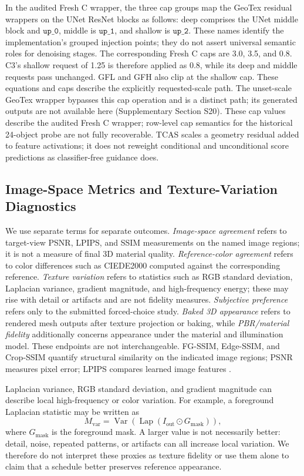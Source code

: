 \documentclass[times,twocolumn,final]{elsarticle}
\begin{document}
In the audited Fresh C wrapper, the three cap groups map the GeoTex residual wrappers on the UNet ResNet blocks as follows: deep comprises the UNet middle block and $\texttt{up\_0}$, middle is $\texttt{up\_1}$, and shallow is $\texttt{up\_2}$. These names identify the implementation's grouped injection points; they do not assert universal semantic roles for denoising stages. The corresponding Fresh C caps are 3.0, 3.5, and 0.8. C3's shallow request of 1.25 is therefore applied as 0.8, while its deep and middle requests pass unchanged. GFL and GFH also clip at the shallow cap. These equations and caps describe the explicitly requested-scale path. The unset-scale GeoTex wrapper bypasses this cap operation and is a distinct path; its generated outputs are not available here (Supplementary Section S20). These cap values describe the audited Fresh C wrapper; row-level cap semantics for the historical 24-object probe are not fully recoverable. TCAS scales a geometry residual added to feature activations; it does not reweight conditional and unconditional score predictions as classifier-free guidance does.

\subsection{Image-Space Metrics and Texture-Variation Diagnostics}
\label{subsec:metrics}

We use separate terms for separate outcomes. \emph{Image-space agreement} refers to target-view PSNR, LPIPS, and SSIM measurements on the named image regions; it is not a measure of final 3D material quality. \emph{Reference-color agreement} refers to color differences such as CIEDE2000 computed against the corresponding reference. \emph{Texture variation} refers to statistics such as RGB standard deviation, Laplacian variance, gradient magnitude, and high-frequency energy; these may rise with detail or artifacts and are not fidelity measures. \emph{Subjective preference} refers only to the submitted forced-choice study. \emph{Baked 3D appearance} refers to rendered mesh outputs after texture projection or baking, while \emph{PBR/material fidelity} additionally concerns appearance under the material and illumination model. These endpoints are not interchangeable. FG-SSIM, Edge-SSIM, and Crop-SSIM quantify structural similarity on the indicated image regions; PSNR measures pixel error; LPIPS compares learned image features \cite{wang2004ssim,zhang2018lpips}.

Laplacian variance, RGB standard deviation, and gradient magnitude can describe local high-frequency or color variation. For example, a foreground Laplacian statistic may be written as
\begin{equation}
M_{\mathrm{var}}=\operatorname{Var}\!\left(\operatorname{Lap}(I_{\mathrm{out}}\odot G_{\mathrm{mask}})\right),
\end{equation}
where $G_{\mathrm{mask}}$ is the foreground mask. A larger value is not necessarily better: detail, noise, repeated patterns, or artifacts can all increase local variation. We therefore do not interpret these proxies as texture fidelity or use them alone to claim that a schedule better preserves reference appearance.
\end{document}
